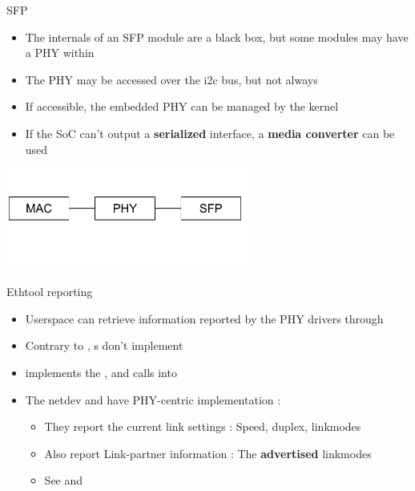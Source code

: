 \begin{frame}{SFP}
	\begin{itemize}
		\item The internals of an SFP module are a black box, but some modules may have a PHY within
		\item The PHY may be accessed over the i2c bus, but not always
		\item If accessible, the embedded PHY can be managed by the kernel
		\item If the SoC can't output a \textbf{serialized} interface, a \textbf{media converter} can be used
	\end{itemize}
	\includegraphics[width=0.6\textwidth]{slides/networking-driver-phy/phy_sfp.pdf}
\end{frame}

\begin{frame}{Ethtool reporting}
	\begin{itemize}
		\item Userspace can retrieve information reported by the PHY drivers through 
		\item Contrary to , s don't implement 
		\item {} implements the , and calls into 
		\item The netdev  and  have PHY-centric implementation :
			\begin{itemize}
				\item They report the current link settings : Speed, duplex, linkmodes
				\item Also report Link-partner information : The \textbf{advertised} linkmodes 
				\item See  and 
			\end{itemize}
	\end{itemize}
\end{frame}

